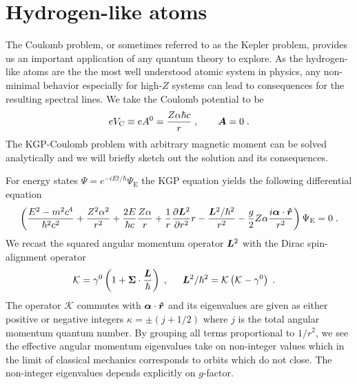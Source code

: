 \section{Hydrogen-like atoms}
\label{sec:coulomb}
The Coulomb problem, or sometimes referred to as the Kepler problem, provides us an important application of any quantum theory to explore. As the hydrogen-like atoms are the the most well understood atomic system in physics, any non-minimal behavior especially for high-$Z$ systems can lead to consequences for the resulting spectral lines. We take the Coulomb potential to be
\begin{equation}
	\label{eq:coulomb:01} eV_\mathrm{C}\equiv e A^{0}=\frac{Z \alpha\hbar c}{r}\;,\qquad \boldsymbol{A}=0\;.
\end{equation}
The KGP-Coulomb problem with arbitrary magnetic moment can be solved analytically and we will briefly sketch out the solution and its consequences.

For energy states $\Psi=e^{-iEt/\hbar}\Psi_\mathrm{E}$ the KGP equation yields the following differential equation
\begin{alignat}{1}
	\label{cou02} \left(\frac{E^{2}-m^{2}c^{4}}{\hbar^{2}c^{2}}+\frac{Z^{2}\alpha^{2}}{r^{2}}+\frac{2E}{\hbar c}\frac{Z\alpha}{r}+\frac{1}{r}\frac{\partial\boldsymbol{L}^{2}}{\partial r^{2}}r-\frac{\boldsymbol{L}^{2}/\hbar^{2}}{r^{2}}-\frac{g}{2}Z\alpha\frac{i\boldsymbol{\alpha}\cdot\boldsymbol{\hat{r}}}{r^{2}}\right)\Psi_\mathrm{E}=0\;.
\end{alignat}
We recast the squared angular momentum operator $\boldsymbol{L}^{2}$ with the Dirac spin-alignment operator
\begin{alignat}{1}
\label{cou04} &\mathcal{K}=\gamma^{0}\left(1+\bb{\Sigma}\cdot\frac{\bb{L}}{\hbar}\right)\;,\indent \bb{L}^{2}/\hbar^{2}=\mathcal{K}\left(\mathcal{K}-\gamma^{0}\right)\;.
\end{alignat}
The operator $\mathcal{K}$ commutes with $\boldsymbol{\alpha}\cdot\boldsymbol{\hat{r}}$ and its eigenvalues are given as either positive or negative integers $\kappa=\pm(j+1/2)$ where $j$ is the total angular momentum quantum number. By grouping all terms proportional to $1/r^{2}$, we see the effective angular momentum eigenvalues take on non-integer values which in the limit of classical mechanics corresponds to orbits which do not close. The non-integer eigenvalues depends explicitly on $g$-factor.

